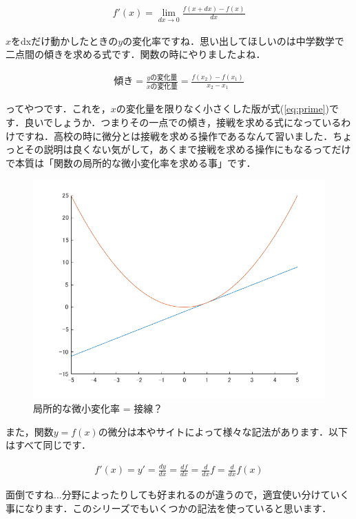\documentclass[11pt,a4paper]{jreport}
\begin{document}
\begin{eqnarray}
\label{eq:prime}
f'(x) =\lim_{dx \rightarrow 0} \frac{f(x+dx) - f(x)}{dx}
\end{eqnarray}

$x$をdxだけ動かしたときの$y$の変化率ですね．思い出してほしいのは中学数学で二点間の傾きを求める式です．関数の時にやりましたよね．

\begin{eqnarray}
傾き = \frac{yの変化量}{xの変化量} = \frac{f(x_2) - f(x_1)}{x_2 - x_1}
\end{eqnarray}

ってやつです．これを，$x$の変化量を限りなく小さくした版が式(\ref{eq:prime})です．良いでしょうか．つまりその一点での傾き，接戦を求める式になっているわけですね．高校の時に微分とは接戦を求める操作であるなんて習いました．ちょっとその説明は良くない気がして，あくまで接戦を求める操作にもなるってだけで本質は「関数の局所的な微小変化率を求める事」です．\\

\begin{figure}[H]
\label{im:sessen}
  \centering
  \includegraphics[width=120mm,bb=0 0 700 525]{../figures/sessen.png}
  \caption{局所的な微小変化率 = 接線？}
\end{figure}

また，関数$y=f(x)$の微分は本やサイトによって様々な記法があります．以下はすべて同じです．

\begin{eqnarray}
f'(x) = y' = \frac{dy}{dx} = \frac{df}{dx} = \frac{d}{dx}f = \frac{d}{dx}f(x)\nonumber
\end{eqnarray}

面倒ですね...分野によったりしても好まれるのが違うので，適宜使い分けていく事になります．このシリーズでもいくつかの記法を使っていると思います．
\end{document}
